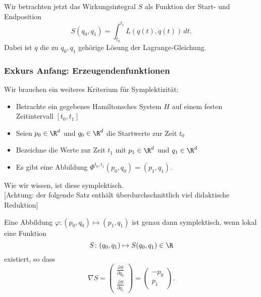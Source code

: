 \bigskip

Wir betrachten jetzt das Wirkungsintegral $S$ als Funktion der Start- und Endposition
\begin{equation*}
	S(q_0,q_1) = \int_{t_0}^{t_1} L(q(t),\dot q(t))\,dt.
\end{equation*}
Dabei ist $q$ die zu $q_0,q_1$ gehörige Lösung der Lagrange-Gleichung.\\

\subsubsection*{Exkurs Anfang: Erzeugendenfunktionen}

Wir brauchen ein weiteres Kriterium für Symplektizität:
\begin{itemize}
	\item Betrachte ein gegebenes Hamiltonsches System $H$ auf einem festen Zeitintervall $[t_0,t_1]$
	\item Seien $p_0 \in \R^d$ und $q_0 \in \R^d$ die Startwerte zur Zeit $t_0$
	\item Bezeichne die Werte zur Zeit $t_1$ mit  $p_1 \in \R^d$ und $q_1 \in \R^d$
	\item Es gibt eine Abbildung $\Phi^{t_0,t_1}(p_0,q_0) = (p_1,q_1)$.
\end{itemize}

Wie wir wissen, ist diese symplektisch.\\
{[Achtung: der folgende Satz enthält überdurchschnittlich viel didaktische Reduktion]}

\begin{satz}
\label{thm:erzeugendenfunktion}
	Eine Abbildung $\varphi\colon (p_0,q_0) \mapsto (p_1,q_1)$ ist genau dann symplektisch, wenn lokal eine Funktion
	\begin{equation*}
	S\colon (q_0,q_1)\mapsto S(q_0,q_1)\in\R
	\end{equation*}
	existiert, so dass
	\begin{equation}\label{eq:abbildung_symplektisch}
	\nabla S
	=
	\begin{pmatrix}
		\frac{\partial S}{\partial q_0}  \\
		\frac{\partial S}{\partial q_1}
	\end{pmatrix} = \begin{pmatrix}
		-p_0 \\ p_1
	\end{pmatrix}.
	\end{equation}
\end{satz}

